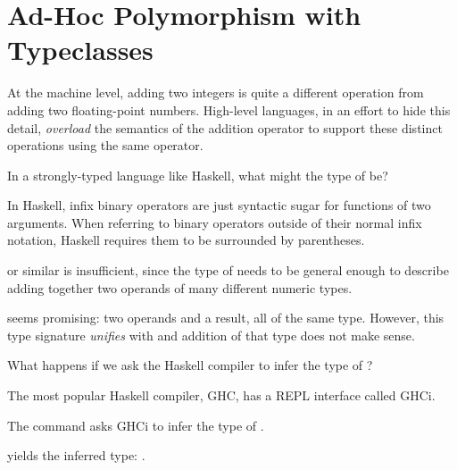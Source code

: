 \section{Ad-Hoc Polymorphism with Typeclasses}

\begin{notelist}
    \item At the machine level, adding two integers is quite a different operation from
          adding two floating-point numbers. High-level languages, in an effort to hide
          this detail, \textit{overload} the semantics of the addition operator to support 
          these distinct operations using the same operator. 

    \item In a strongly-typed language like Haskell, what might the type of \code{(+)} be?
    \begin{notelist}
        \item In Haskell, infix binary operators are just syntactic sugar for functions
              of two arguments. When referring to binary operators outside of their
              normal infix notation, Haskell requires them to be surrounded by parentheses.
    \end{notelist}

    \item {} or similar is insufficient, since the type of \code{(+)}
          needs to be general enough to describe adding together two operands
          of many different numeric types.

    \item {} seems promising: two operands and a result, all of the same type. However,
          this type signature \textit{unifies} with 
          and addition of that type does not make sense.

    \item What happens if we ask the Haskell compiler to infer the type of \code{(+)}?
    \begin{notelist}
        \item The most popular Haskell compiler, GHC, has a REPL interface called GHCi.
        \item The command  asks GHCi to infer the type of
              .
        \item {} yields the inferred type: .
    \end{notelist}


\end{notelist}
